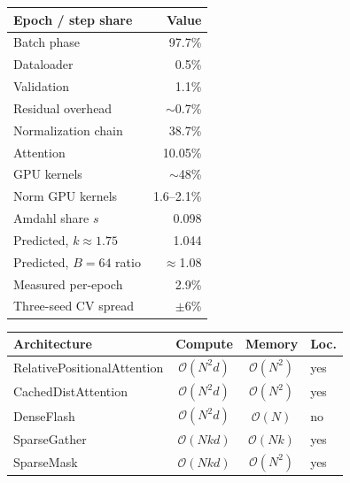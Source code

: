 \begin{frame}
  \centering
  \begin{minipage}{0.39\textwidth}
    \centering
    \scriptsize
    \renewcommand{\arraystretch}{1.12}
    \setlength{\tabcolsep}{1.4mm}
    \begin{tabular}{@{}p{30mm}r@{}}
      \toprule
      \textbf{Epoch / step share} & \textbf{Value} \\
      \midrule
      Batch phase & 97.7\% \\
      Dataloader & 0.5\% \\
      Validation & 1.1\% \\
      Residual overhead & $\sim$0.7\% \\
      Normalization chain & 38.7\% \\
      Attention & 10.05\% \\
      GPU kernels & $\sim$48\% \\
      Norm GPU kernels & 1.6--2.1\% \\
      \midrule
      Amdahl share $s$ & 0.098 \\
      Predicted, $k\approx1.75$ & 1.044 \\
      Predicted, $B{=}64$ ratio & $\approx$1.08 \\
      Measured per-epoch & 2.9\% \\
      Three-seed CV spread & $\pm$6\% \\
      \bottomrule
    \end{tabular}
  \end{minipage}\hfill
  \begin{minipage}{0.58\textwidth}
    \centering
    \scriptsize
    \renewcommand{\arraystretch}{1.25}
    \setlength{\tabcolsep}{0.8mm}
    \begin{tabular}{@{}p{40mm}ccp{8mm}@{}}
      \toprule
      \textbf{Architecture} & \textbf{Compute} & \textbf{Memory} & \textbf{Loc.} \\
      \midrule
      RelativePositionalAttention & $\mathcal{O}(N^2d)$ & $\mathcal{O}(N^2)$ & yes \\
      CachedDistAttention & $\mathcal{O}(N^2d)$ & $\mathcal{O}(N^2)$ & yes \\
      DenseFlash & $\mathcal{O}(N^2d)$ & $\mathcal{O}(N)$ & no \\
      SparseGather & $\mathcal{O}(Nkd)$ & $\mathcal{O}(Nk)$ & yes \\
      SparseMask & $\mathcal{O}(Nkd)$ & $\mathcal{O}(N^2)$ & yes \\
      \bottomrule
    \end{tabular}


  \end{minipage}
\end{frame}

